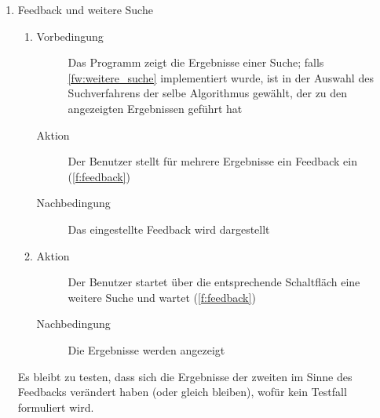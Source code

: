 \begin{enumerate} [label=\bfseries /TS \arabic*0/, leftmargin=*]
\begin{enumerate}[leftmargin=0pt]
\begin{description}
			\item[Nachbedingung] Das eben gewählte Bild wird in der vergrößerten Ansicht dargestellt; der gewählte Bildbereich wird angezeigt
		\end{description}
		\item
		\begin{description}
			\item[Aktion] Der Benutzer verwendet die Schaltflächen, um zum nächsten und vorherigen Bild zu wechseln (\ref{f:vorheriges_naechstes})
			\item[Nachbedingung] Das Bild in der größeren Ansicht wechselt vor bzw. zurück entsprechend der durch die Übersicht gegebenen Reihenfolge
		\end{description}
		\item
		\begin{description}
			\item[Aktion] Der Benutzer linksklickt die Schaltfläche zur Rückkehr zur Bibliothek \ref{f:rückkehr_zu_bibliothek}
			\item[Nachbedingung] Die Bibliothek wird angezeigt
		\end{description}
	\end{enumerate}

	\item Feedback und weitere Suche \label{ts:feedback}
	\begin{enumerate}[leftmargin=0pt]
		\item
		\begin{description}
			\item[Vorbedingung] Das Programm zeigt die Ergebnisse einer Suche; falls \ref{fw:weitere_suche} implementiert wurde, ist in der Auswahl des Suchverfahrens der selbe Algorithmus gewählt, der zu den angezeigten Ergebnissen geführt hat
			\item[Aktion] Der Benutzer stellt für mehrere Ergebnisse ein Feedback ein (\ref{f:feedback})
			\item[Nachbedingung] Das eingestellte Feedback wird dargestellt
		\end{description}
		\item
		\begin{description}
			\item[Aktion] Der Benutzer startet über die entsprechende Schaltfläch eine weitere Suche und wartet (\ref{f:feedback})
			\item[Nachbedingung] Die Ergebnisse werden angezeigt
		\end{description}
	\end{enumerate}
	Es bleibt zu testen, dass sich die Ergebnisse der zweiten im Sinne des Feedbacks verändert haben (oder gleich bleiben), wofür kein Testfall formuliert wird.


\end{enumerate}
